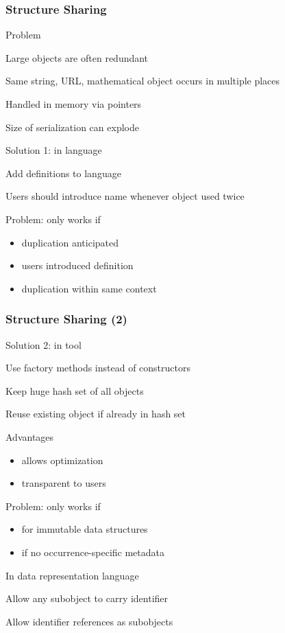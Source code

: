 \begin{frame}\frametitle{Structure Sharing}
\begin{blockitems}{Problem}
\item Large objects are often redundant
\item Same string, URL, mathematical object occurs in multiple places
\item Handled in memory via pointers
\item Size of serialization can explode
\end{blockitems}

\begin{blockitems}{Solution 1: in language}
\item Add definitions to language
\item Users should introduce name whenever object used twice
\item Problem: only works if 
 \begin{itemize}
  \item duplication anticipated
  \item users introduced definition
  \item duplication within same context
 \end{itemize}
\end{blockitems}
\end{frame}

\begin{frame}\frametitle{Structure Sharing (2)}
\begin{blockitems}{Solution 2: in tool}
\item Use factory methods instead of constructors
\item Keep huge hash set of all objects
\item Reuse existing object if already in hash set
\item Advantages
 \begin{itemize}
  \item allows optimization
  \item transparent to users
 \end{itemize}
\item Problem: only works if 
 \begin{itemize}
  \item for immutable data structures
  \item if no occurrence-specific metadata 
 \end{itemize}
\end{blockitems}

\begin{blockitems}{In data representation language}
\item Allow any subobject to carry identifier
\item Allow identifier references as subobjects
\end{blockitems}
\end{frame}

